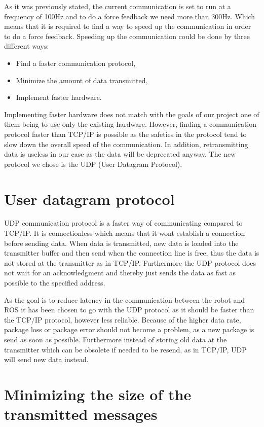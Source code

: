 As it was previously stated, the current communication is set to run at a frequency of 100Hz and to do a force feedback we need more than 300Hz. Which means that it is required to find a way to speed up the communication in order to do a force feedback. Speeding up the communication could be done by three different ways:

\begin{itemize}
	\item Find a faster communication protocol,
	\item Minimize the amount of data transmitted,
	\item Implement faster hardware.	
\end{itemize}

Implementing faster hardware does not match with the goals of our project one of them being to use only the existing hardware. 
However, finding a communication protocol faster than TCP/IP is possible as the safeties in the protocol tend to slow down the overall speed of the communication. In addition, retransmitting data is useless in our case as the data will be deprecated anyway. The new protocol we chose is the UDP (User Datagram Protocol).

\section*{User datagram protocol}
UDP communication protocol is a faster way of communicating compared to TCP/IP. It is connectionless which means that it wont establish a connection before sending data. When data is transmitted, new data is loaded into the transmitter buffer and then send when the connection line is free, thus the data is not stored at the transmitter as in TCP/IP. Furthermore the UDP protocol does not wait for an acknowledgment and thereby just sends the data as fast as possible to the specified address.

As the goal is to reduce latency in the communication between the robot and ROS it has been chosen to go with the UDP protocol as it should be faster than the TCP/IP protocol, however less reliable. Because of the higher data rate, package loss or package error should not become a problem, as a new package is send as soon as possible. Furthermore instead of storing old data at the transmitter which can be obsolete if needed to be resend, as in TCP/IP, UDP will send new data instead.

\section*{Minimizing the size of the transmitted messages}

